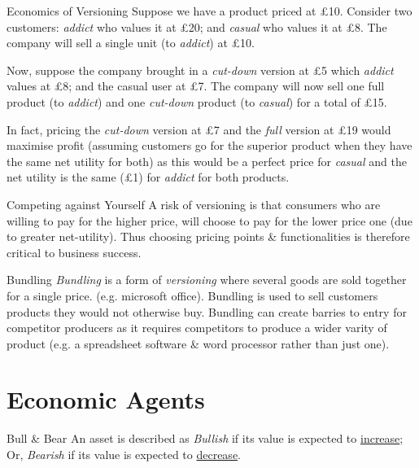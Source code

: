 \documentclass[11pt,a4paper]{article}
\begin{document}
  \begin{example}{Economics of Versioning}
    Suppose we have a product priced at £10. Consider two customers: \textit{addict} who values it at £20; and \textit{casual} who values it at £8. The company will sell a single unit (to \textit{addict}) at £10.
    \par Now, suppose the company brought in a \textit{cut-down} version at £5 which \textit{addict} values at £8; and the casual user at £7. The company will now sell one full product (to \textit{addict}) and one \textit{cut-down} product (to \textit{casual}) for a total of £15.
    \par In fact, pricing the \textit{cut-down} version at £7 and the \textit{full} version at £19 would maximise profit (assuming customers go for the superior product when they have the same net utility for both) as this would be a perfect price for  \textit{casual} and the net utility is the same (£1) for \textit{addict} for both products.
  \end{example}

  \begin{proposition}{Competing against Yourself}
    A risk of versioning is that consumers who are willing to pay for the higher price, will choose to pay for the lower price one (due to greater net-utility). Thus choosing pricing points \& functionalities is therefore critical to business success.
  \end{proposition}

  \begin{proposition}{Bundling}
    \textit{Bundling} is a form of \textit{versioning} where several goods are sold together for a single price. (e.g. microsoft office). Bundling is used to sell customers products they would not otherwise buy. Bundling can create barries to entry for competitor producers as it requires competitors to produce a wider varity of product (e.g. a spreadsheet software \& word processor rather than just one).
  \end{proposition}

\section{Economic Agents}

  \begin{definition}{Bull \& Bear}
    An asset is described as \textit{Bullish} if its value is expected to \underline{increase}; Or, \textit{Bearish} if its value is expected to \underline{decrease}.
  \end{definition}
\end{document}
